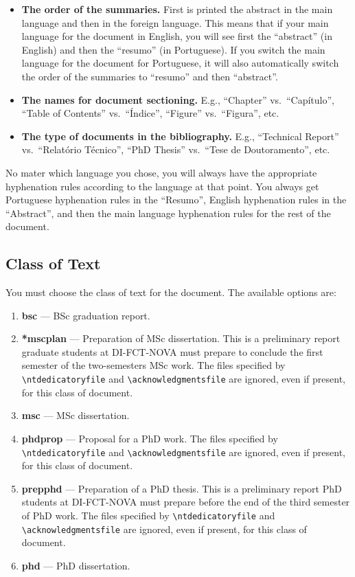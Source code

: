 \begin{itemize}
  \item \textbf{The order of the summaries.} First is printed the abstract in the main language and then in the foreign language. This means that if your main language for the document in English, you will see first the “abstract” (in English) and then the “resumo” (in Portuguese). If you switch the main language for the document for Portuguese, it will also automatically switch the order of the summaries to “resumo” and then “abstract”.
  \item \textbf{The names for document sectioning.} E.g., ``Chapter'' vs.\ ``Capítulo'', ``Table of Contents'' vs.\ ``Índice'', ``Figure'' vs.\ ``Figura'', etc.
  \item \textbf{The type of documents in the bibliography.} E.g., ``Technical Report'' vs.\ ``Relatório Técnico'', ``PhD Thesis'' vs.\ ``Tese de Doutoramento'', etc.
\end{itemize}

No mater which language you chose, you will always have the appropriate hyphenation rules according to the language at that point. You always get Portuguese hyphenation rules in the ``Resumo'', English hyphenation rules in the ``Abstract'', and then the main language hyphenation rules for the rest of the document.




\subsection{Class of Text}
\label{sub:class_of_text}

You must choose the class of text for the document. The available options are:

\begin{enumerate}
  \item \textbf{bsc} --- BSc graduation report.
  \item \textbf{*mscplan} --- Preparation of MSc dissertation. This is a preliminary report graduate students at DI-FCT-NOVA must prepare to conclude the first semester of the two-semesters MSc work. The files specified by \verb!\ntdedicatoryfile! and \verb!\acknowledgmentsfile! are ignored, even if present, for this class of document.
  \item \textbf{msc} --- MSc dissertation.
  \item \textbf{phdprop} ---  Proposal for a PhD work. The files specified by \verb!\ntdedicatoryfile! and \verb!\acknowledgmentsfile! are ignored, even if present, for this class of document.
  \item \textbf{prepphd} ---  Preparation of a PhD thesis. This is a preliminary report PhD students at DI-FCT-NOVA must prepare before the end of the third semester of PhD work. The files specified by \verb!\ntdedicatoryfile! and \verb!\acknowledgmentsfile! are ignored, even if present, for this class of document.
  \item \textbf{phd} --- PhD dissertation.
\end{enumerate}

